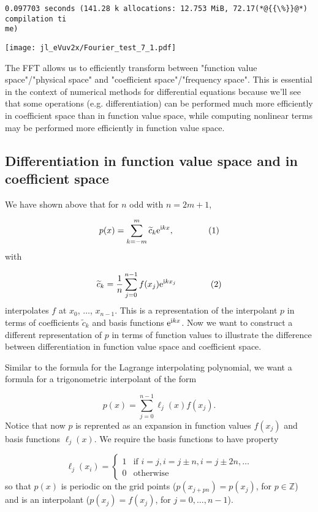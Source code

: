 \documentclass[12pt,a4paper]{article}
\begin{document}
\begin{lstlisting}
0.097703 seconds (141.28 k allocations: 12.753 MiB, 72.17(*@{{\%}}@*) compilation ti
me)
\end{lstlisting}

\texttt{[image: jl\_eVuv2x/Fourier\_test\_7\_1.pdf]}

The FFT allows us to efficiently transform between "function value space"/"physical space" and "coefficient space"/"frequency space".  This is essential in the context of numerical methods for differential equations because we'll see that some operations (e.g. differentiation) can be performed much more efficiently in coefficient space than in function value space, while computing nonlinear terms may be performed more efficiently in function value space.   

\subsection{Differentiation in function value space and in coefficient space}
We have shown above that for $n$ odd with $n = 2m+1$,

\[
p(x) = \sum_{k=-m}^{m} \widetilde{c}_k{\rm e}^{{\rm i}kx},  \qquad \qquad (1)
\]
with

\[
\widetilde{c}_k = \frac{1}{n}\sum_{j=0}^{n-1}f(x_j){\rm e}^{{\rm i}kx_j}  \qquad  \qquad (2)
\]
interpolates $f$ at $x_0$, $\ldots$, $x_{n-1}$. This is a representation of the interpolant $p$ in terms of coefficients $\widetilde{c}_k$ and basis functions ${\rm e}^{{\rm i}kx}$.   Now we want to construct a different representation of $p$ in terms of function values to illustrate the difference between differentiation in function value space and coefficient space. 

Similar to the formula for the Lagrange interpolating polynomial, we want a formula for a trigonometric interpolant of the form

\[
p(x) = \sum_{j=0}^{n-1}\ell_{j}(x) f(x_{j}).
\]
Notice that now $p$ is reprented as an expansion in function values $f(x_{j})$ and basis functions $\ell_{j}(x)$. We require the basis functions to have property

\[
\ell_{j}(x_i) = \begin{cases}
1 & \text{if } i = j, i = j \pm n, i = j \pm 2n, \ldots \\
0 & \text{otherwise } 
\end{cases}
\]
so that $p(x)$ is periodic on the grid points ($p(x_{j + pn}) = p(x_{j})$, for $p \in \mathbb{Z}$) and is an interpolant ($p(x_{j}) = f(x_{j})$, for $j = 0, \ldots, n-1$). 
\end{document}
